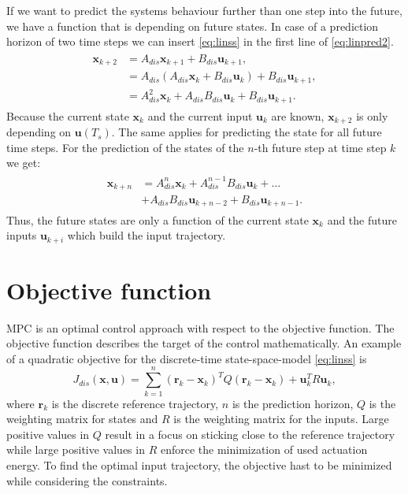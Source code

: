 If we want to predict the systems behaviour further than one step into the future, we have a function that is depending on future states.
In case of a prediction horizon of two time steps we can insert \eqref{eq:linss} in the first line of \eqref{eq:linpred2}.
\begin{align}\label{eq:linpred2}
\begin{split}
\mathbf{x}_{k+2} &= A_{dis} \mathbf{x}_{k+1} + B_{dis} \mathbf{u}_{k+1}, \\
                 &= A_{dis} \left(  A_{dis} \mathbf{x}_k + B_{dis} \mathbf{u}_k \right) + B_{dis} \mathbf{u}_{k+1}, \\
                 &= A_{dis}^2 \mathbf{x}_k + A_{dis} B_{dis} \mathbf{u}_k + B_{dis} \mathbf{u}_{k+1}.
\end{split}
\end{align}
Because the current state $\mathbf{x}_k$ and the current input $\mathbf{u}_k$ are known, $\mathbf{x}_{k+2}$ is only depending on $\mathbf{u}(T_s)$.
The same applies for predicting the state for all future time steps.
For the prediction of the states of the $n$-th future step at time step $k$ we get:
\begin{align}\label{eq:linpredn}
\begin{split}
\mathbf{x}_{k+n}&=A_{dis}^n\mathbf{x}_k+A_{dis}^{n-1}B_{dis}\mathbf{u}_k+\ldots\\
                &+A_{dis}B_{dis}\mathbf{u}_{k+n-2}+B_{dis}\mathbf{u}_{k+n-1}.
\end{split}
\end{align}
Thus, the future states are only a function of the current state $\mathbf{x}_k$ and the future inputs $\mathbf{u}_{k+i}$ which build the input trajectory.


\section{Objective function}
\label{sec:objective}

MPC is an optimal control approach with respect to the objective function.
The objective function describes the target of the control mathematically.
An example of a quadratic objective for the discrete-time state-space-model \eqref{eq:linss} is
\begin{equation}\label{eq:quadratic_cost}
J_{dis}(\mathbf{x},\mathbf{u}) = \sum_{k=1}^{n} (\mathbf{r}_k-\mathbf{x}_k)^TQ(\mathbf{r}_k-\mathbf{x}_k)+\mathbf{u}_k^TR\mathbf{u}_k,
\end{equation}
where $\mathbf{r}_k$ is the discrete reference trajectory, $n$ is the prediction horizon, $Q$ is the weighting matrix for states and $R$ is the weighting matrix for the inputs.
Large positive values in $Q$ result in a focus on sticking close to the reference trajectory while large positive values in $R$ enforce the minimization of used actuation energy.
To find the optimal input trajectory, the objective hast to be minimized while considering the constraints.

